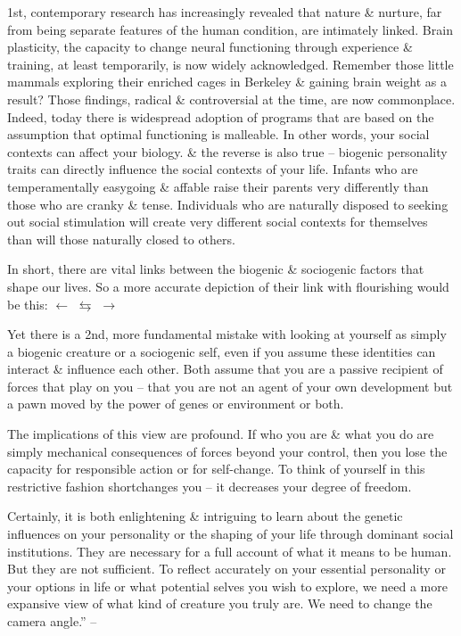 \documentclass{article}
\numberwithin{equation}{section}
\begin{document}
1st, contemporary research has increasingly revealed that nature \& nurture, far from being separate features of the human condition, are intimately linked. Brain plasticity, the capacity to change neural functioning through experience \& training, at least temporarily, is now widely acknowledged. Remember those little mammals exploring their enriched cages in Berkeley \& gaining brain weight as a result? Those findings, radical \& controversial at the time, are now commonplace. Indeed, today there is widespread adoption of programs that are based on the assumption that optimal functioning is malleable. In other words, your social contexts can affect your biology. \& the reverse is also true -- biogenic personality traits can directly influence the social contexts of your life. Infants who are temperamentally easygoing \& affable raise their parents very differently than those who are cranky \& tense. Individuals who are naturally disposed to seeking out social stimulation will create very different social contexts for themselves than will those naturally closed to others.

In short, there are vital links between the biogenic \& sociogenic factors that shape our lives. So a more accurate depiction of their link with flourishing would be this:  $\leftarrow$  $\leftrightarrows$  $\rightarrow$ 

Yet there is a 2nd, more fundamental mistake with looking at yourself as simply a biogenic creature or a sociogenic self, even if you assume these identities can interact \& influence each other. Both assume that you are a passive recipient of forces that play on you -- that you are not an agent of your own development but a pawn moved by the power of genes or environment or both.

The implications of this view are profound. If who you are \& what you do are simply mechanical consequences of forces beyond your control, then you lose the capacity for responsible action or for self-change. To think of yourself in this restrictive fashion shortchanges you -- it decreases your degree of freedom.

Certainly, it is both enlightening \& intriguing to learn about the genetic influences on your personality or the shaping of your life through dominant social institutions. They are necessary for a full account of what it means to be human. But they are not sufficient. To reflect accurately on your essential personality or your options in life or what potential selves you wish to explore, we need a more expansive view of what kind of creature you truly are. We need to change the camera angle.'' -- \cite[pp. 21--23]{Little2017}
\end{document}
